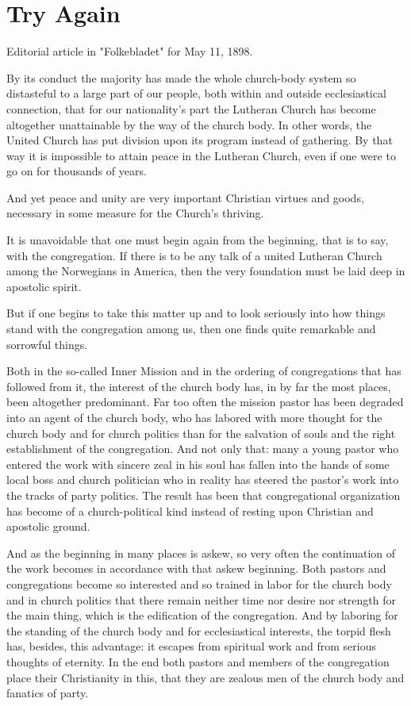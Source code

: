 
\section{Try Again}

Editorial article in "Folkebladet" for May 11, 1898.

By its conduct the majority has made the whole church-body system so distasteful to a large part of our people, both within and outside ecclesiastical connection, that for our nationality’s part the Lutheran Church has become altogether unattainable by the way of the church body. In other words, the United Church has put division upon its program instead of gathering. By that way it is impossible to attain peace in the Lutheran Church, even if one were to go on for thousands of years.

And yet peace and unity are very important Christian virtues and goods, necessary in some measure for the Church’s thriving.

It is unavoidable that one must begin again from the beginning, that is to say, with the congregation. If there is to be any talk of a united Lutheran Church among the Norwegians in America, then the very foundation must be laid deep in apostolic spirit.

But if one begins to take this matter up and to look seriously into how things stand with the congregation among us, then one finds quite remarkable and sorrowful things.

Both in the so-called Inner Mission and in the ordering of congregations that has followed from it, the interest of the church body has, in by far the most places, been altogether predominant. Far too often the mission pastor has been degraded into an agent of the church body, who has labored with more thought for the church body and for church politics than for the salvation of souls and the right establishment of the congregation. And not only that: many a young pastor who entered the work with sincere zeal in his soul has fallen into the hands of some local boss and church politician who in reality has steered the pastor’s work into the tracks of party politics. The result has been that congregational organization has become of a church-political kind instead of resting upon Christian and apostolic ground.

And as the beginning in many places is askew, so very often the continuation of the work becomes in accordance with that askew beginning. Both pastors and congregations become so interested and so trained in labor for the church body and in church politics that there remain neither time nor desire nor strength for the main thing, which is the edification of the congregation. And by laboring for the standing of the church body and for ecclesiastical interests, the torpid flesh has, besides, this advantage: it escapes from spiritual work and from serious thoughts of eternity. In the end both pastors and members of the congregation place their Christianity in this, that they are zealous men of the church body and fanatics of party.

